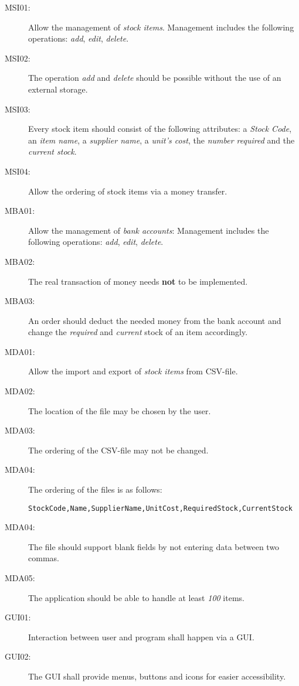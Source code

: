 \begin{description}
\item[MSI01:] Allow the management of \textit{stock items}. Management includes the following operations: \textit{add}, \textit{edit}, \textit{delete}.
\item[MSI02:] The operation \textit{add} and \textit{delete} should be possible without the use of an external storage.
\item[MSI03:] Every stock item should consist of the following attributes: a \textit{Stock Code}, an \textit{item name}, a \textit{supplier name}, a \textit{unit's cost}, the \textit{number required} and the \textit{current stock}.
\item[MSI04:] Allow the ordering of stock items via a money transfer.
\item[MBA01:] Allow the management of \textit{bank accounts}: Management includes the following operations: \textit{add}, \textit{edit}, \textit{delete}.
\item[MBA02:] The real transaction of money needs \textbf{not} to be implemented.
\item[MBA03:] An order should deduct the needed money from the bank account and change the \textit{required} and \textit{current} stock of an item accordingly.
\item[MDA01:] Allow the import and export of \textit{stock items} from \ac{CSV}-file.
\item[MDA02:] The location of the file may be chosen by the user.
\item[MDA03:] The ordering of the \ac{CSV}-file may not be changed.
\item[MDA04:] The ordering of the files is as follows:
\begin{lstlisting}
StockCode,Name,SupplierName,UnitCost,RequiredStock,CurrentStock
\end{lstlisting}
\item[MDA04:] The file should support blank fields by not entering data between two commas.
\item[MDA05:] The application should be able to handle at least \textit{100} items.
\item[GUI01:] Interaction between user and program shall happen via a \ac{GUI}.
\item[GUI02:] The \ac{GUI} shall provide menus, buttons and icons for easier accessibility.
\end{description}
